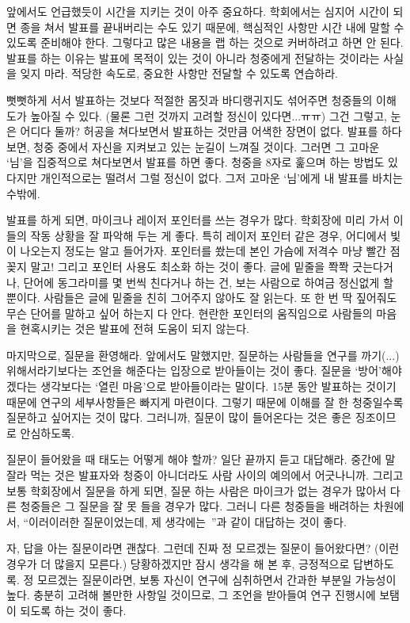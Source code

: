앞에서도 언급했듯이 시간을 지키는 것이 아주 중요하다. 학회에서는 심지어 시간이
되면 종을 쳐서 발표를 끝내버리는 수도 있기 때문에, 핵심적인 사항만 시간 내에 말할
수 있도록 준비해야 한다. 그렇다고 많은 내용을 랩 하는 것으로 커버하려고 하면 안
된다. 발표를 하는 이유는 발표에 목적이 있는 것이 아니라 청중에게 전달하는
것이라는 사실을 잊지 마라. 적당한 속도로, 중요한 사항만 전달할 수 있도록
연습하라.

뻣뻣하게 서서 발표하는 것보다 적절한 몸짓과 바디랭귀지도 섞어주면 청중들의
이해도가 높아질 수 있다. (물론 그런 것까지 고려할 정신이 있다면...ㅠㅠ) 그건
그렇고, 눈은 어디다 둘까? 허공을 쳐다보면서 발표하는 것만큼 어색한 장면이
없다. 발표를 하다 보면, 청중 중에서 자신을 지켜보고 있는 눈길이 느껴질
것이다. 그러면 그 고마운 ‘님’을 집중적으로 쳐다보면서 발표를 하면 좋다. 청중을
8자로 훑으며 하는 방법도 있다지만 개인적으로는 떨려서 그럴 정신이 없다. 그저
고마운 ‘님’에게 내 발표를 바치는 수밖에.

발표를 하게 되면, 마이크나 레이저 포인터를 쓰는 경우가 많다. 학회장에 미리 가서
이들의 작동 상황을 잘 파악해 두는 게 좋다. 특히 레이저 포인터 같은 경우, 어디에서
빛이 나오는지 정도는 알고 들어가자. 포인터를 쐈는데 본인 가슴에 저격수 마냥 빨간
점 꽂지 말고! 그리고 포인터 사용도 최소화 하는 것이 좋다. 글에 밑줄을 쫙쫙
긋는다거나, 단어에 동그라미를 몇 번씩 친다거나 하는 건, 보는 사람으로 하여금
정신없게 할 뿐이다. 사람들은 글에 밑줄을 친히 그어주지 않아도 잘 읽는다. 또 한 번
딱 짚어줘도 무슨 단어를 말하고 싶어 하는지 다 안다. 현란한 포인터의 움직임으로
사람들의 마음을 현혹시키는 것은 발표에 전혀 도움이 되지 않는다.

마지막으로, 질문을 환영해라. 앞에서도 말했지만, 질문하는 사람들을 연구를
까기(...) 위해서라기보다는 조언을 해준다는 입장으로 받아들이는 것이 좋다. 질문을
‘방어’해야겠다는 생각보다는 ‘열린 마음’으로 받아들이라는 말이다. 15분 동안
발표하는 것이기 때문에 연구의 세부사항들은 빠지게 마련이다. 그렇기 때문에 이해를
잘 한 청중일수록 질문하고 싶어지는 것이 많다. 그러니까, 질문이 많이 들어온다는
것은 좋은 징조이므로 안심하도록.

질문이 들어왔을 때 태도는 어떻게 해야 할까? 일단 끝까지 듣고 대답해라. 중간에 말
잘라 먹는 것은 발표자와 청중이 아니더라도 사람 사이의 예의에서 어긋나니까. 그리고
보통 학회장에서 질문을 하게 되면, 질문 하는 사람은 마이크가 없는 경우가 많아서
다른 청중들은 그 질문을 잘 못 들을 경우가 많다. 그러니 다른 청중들을 배려하는
차원에서, “이러이러한 질문이었는데, 제 생각에는~”과 같이 대답하는 것이 좋다.

자, 답을 아는 질문이라면 괜찮다. 그런데 진짜 정 모르겠는 질문이 들어왔다면? (이런
경우가 더 많을지 모른다.) 당황하겠지만 잠시 생각을 해 본 후, 긍정적으로
답변하도록. 정 모르겠는 질문이라면, 보통 자신이 연구에 심취하면서 간과한 부분일
가능성이 높다. 충분히 고려해 볼만한 사항일 것이므로, 그 조언을 받아들여 연구
진행시에 보탬이 되도록 하는 것이 좋다.
 
